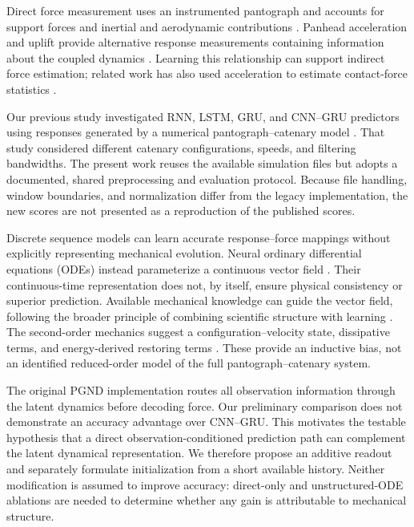 \documentclass[journal,twoside]{IEEEtran}
\begin{document}
Direct force measurement uses an instrumented pantograph and accounts for
support forces and inertial and aerodynamic contributions
\cite{en50317_2012}. Panhead acceleration and uplift provide alternative
response measurements containing information about the coupled dynamics
\cite{carnevale2016processing,blanco2022panhead}. Learning this relationship
can support indirect force estimation; related work has also used
acceleration to estimate contact-force statistics
\cite{gregori2023assessment}.

Our previous study investigated RNN, LSTM, GRU, and CNN--GRU predictors using
responses generated by a numerical pantograph--catenary model
\cite{ale2026realtime}. That study considered different catenary
configurations, speeds, and filtering bandwidths. The present work reuses
the available simulation files but adopts a documented, shared preprocessing
and evaluation protocol. Because file handling, window boundaries, and
normalization differ from the legacy implementation, the new scores are
not presented as a reproduction of the published scores.

Discrete sequence models can learn accurate response--force mappings
without explicitly representing mechanical evolution. Neural ordinary
differential equations (ODEs) instead parameterize a continuous vector field
\cite{chen2018neuralode}. Their continuous-time representation does not,
by itself, ensure physical consistency or superior prediction. Available
mechanical knowledge can guide the vector field, following the broader
principle of combining scientific structure with learning
\cite{karniadakis2021physics}. The second-order mechanics suggest a
configuration--velocity state, dissipative terms, and energy-derived
restoring terms \cite{bruni2015benchmark,bruni2018interaction}.
These provide an inductive bias, not an identified reduced-order model of
the full pantograph--catenary system.

The original PGND implementation routes all observation information through
the latent dynamics before decoding force. Our preliminary comparison does
not demonstrate an accuracy advantage over CNN--GRU. This motivates the
testable hypothesis that a direct observation-conditioned prediction path
can complement the latent dynamical representation. We therefore propose
an additive readout and separately formulate initialization from a short
available history. Neither modification is assumed to improve accuracy:
direct-only and unstructured-ODE ablations are needed to determine whether
any gain is attributable to mechanical structure.
\end{document}
